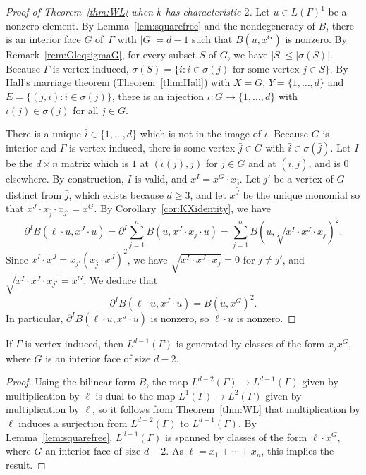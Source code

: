 \begin{proof}[Proof of Theorem~\ref{thm:WL} when $k$ has characteristic $2$]
Let $u \in L(\Gamma)^1$ be a nonzero element. By Lemma~\ref{lem:squarefree} and the nondegeneracy of $B$, there is an interior face $G$ of~$\Gamma$ with $|G| = d-1$ such that $B(u, x^G)$ is nonzero. 
By Remark~\ref{rem:GleqsigmaG},
for every subset $S$ of $G$,  we have $|S| \le |\sigma(S)|$.
Because $\Gamma$ is vertex-induced, $\sigma(S) = \{ i : i \in \sigma(j) \textrm{ for some vertex } j \in S \}$.  
By Hall's marriage theorem (Theorem~\ref{thm:Hall})
with $X = G$, $Y = \{ 1,\ldots,d\}$ and $E = \{ (j,i) : i \in \sigma(j)\}$,
there is an injection $\iota \colon G \to \{1, \dotsc, d\}$ with $\iota(j) \in \sigma(j)$ for all $j \in G$. 


There is a unique $\bar{i} \in \{1, \dotsc, d\}$ which is not in the image of $\iota$. Because $G$ is interior and $\Gamma$ is vertex-induced, there is some vertex $\bar{j} \in G$ with $\bar{i} \in \sigma(\bar{j})$. Let $I$ be the $d \times n$ matrix which is $1$ at $(\iota(j), j)$ for $j \in G$ and at $(\bar{i}, \bar{j})$, and is $0$ elsewhere. By construction, $I$ is valid, and $x^I = x^G \cdot x_{\bar{j}}$. 
Let $j'$ be a vertex of $G$ distinct from $\bar{j}$, which exists because $d \ge 3$, and let $x^J$ be the unique monomial so that $x^J \cdot x_{\bar{j}} \cdot x_{j'} = x^G$. By Corollary~\ref{cor:KXidentity}, we have
$$\partial^I B(\ell \cdot u, x^J \cdot u) = \partial^I \sum_{j=1}^{n} B(u , x^J \cdot x_j \cdot u  ) = \sum_{j=1}^{n} B(u, \sqrt{x^I \cdot x^J \cdot x_j})^2.$$
Since $x^I \cdot x^J = x_{j'} (x_{\bar{j}} \cdot x^J)^2$, we have $\sqrt{x^I \cdot x^J \cdot x_j}  = 0$ for $j \neq j'$,  
and $\sqrt{x^I \cdot x^J \cdot x_{j'}} = x^G$. We deduce that
$$\partial^I B(\ell \cdot u,  x^J \cdot u) = B(u, x^G)^2.$$
In particular, $\partial^I B( \ell \cdot u, x^J \cdot u)$ is nonzero, so $\ell \cdot u$ is nonzero. 
\end{proof}

\begin{coro}\label{cor:dminus1gen}
If $\Gamma$ is vertex-induced, then $L^{d-1}(\Gamma)$ is generated by classes of the form $x_j x^G$, where $G$ is an interior face of size $d-2$. 
\end{coro}

\begin{proof}
Using the bilinear form $B$, the map $L^{d-2}(\Gamma) \to L^{d-1}(\Gamma)$ given by multiplication by $\ell$ is dual to the map $L^1(\Gamma) \to L^2(\Gamma)$ given by multiplication by $\ell$, so it follows from Theorem~\ref{thm:WL} that multiplication by $\ell$ induces a surjection from $L^{d-2}(\Gamma)$ to $L^{d-1}(\Gamma)$. By Lemma~\ref{lem:squarefree}, $L^{d-1}(\Gamma)$ is spanned by classes of the form $\ell \cdot x^G$, where $G$ an interior face of size $d-2$. As $\ell = x_1 + \dotsb + x_n$, this implies the result. 
\end{proof}

